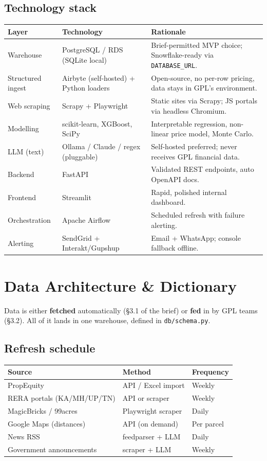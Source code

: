 \documentclass[11pt,a4paper]{article}
\begin{document}
\subsection{Technology stack}
\begin{longtable}{p{3.2cm} p{5cm} p{5.5cm}}
\toprule
\textbf{Layer} & \textbf{Technology} & \textbf{Rationale} \\
\midrule
Warehouse & PostgreSQL / RDS (SQLite local) & Brief-permitted MVP choice; Snowflake-ready via \texttt{DATABASE\_URL}. \\
Structured ingest & Airbyte (self-hosted) + Python loaders & Open-source, no per-row pricing, data stays in GPL's environment. \\
Web scraping & Scrapy + Playwright & Static sites via Scrapy; JS portals via headless Chromium. \\
Modelling & scikit-learn, XGBoost, SciPy & Interpretable regression, non-linear price model, Monte Carlo. \\
LLM (text) & Ollama / Claude / regex (pluggable) & Self-hosted preferred; never receives GPL financial data. \\
Backend & FastAPI & Validated REST endpoints, auto OpenAPI docs. \\
Frontend & Streamlit & Rapid, polished internal dashboard. \\
Orchestration & Apache Airflow & Scheduled refresh with failure alerting. \\
Alerting & SendGrid + Interakt/Gupshup & Email + WhatsApp; console fallback offline. \\
\bottomrule
\end{longtable}

\section{Data Architecture \& Dictionary}
Data is either \textbf{fetched} automatically (\S3.1 of the brief) or \textbf{fed}
in by GPL teams (\S3.2). All of it lands in one warehouse, defined in
\texttt{db/schema.py}.

\subsection{Refresh schedule}
\begin{longtable}{p{4.5cm} p{4cm} p{2.5cm}}
\toprule
\textbf{Source} & \textbf{Method} & \textbf{Frequency} \\
\midrule
PropEquity & API / Excel import & Weekly \\
RERA portals (KA/MH/UP/TN) & API or scraper & Weekly \\
MagicBricks / 99acres & Playwright scraper & Daily \\
Google Maps (distances) & API (on demand) & Per parcel \\
News RSS & feedparser + LLM & Daily \\
Government announcements & scraper + LLM & Weekly \\
\bottomrule
\end{longtable}
\end{document}
